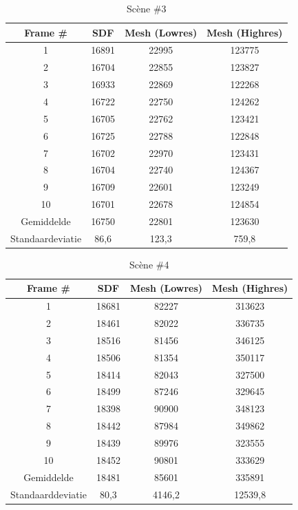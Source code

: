 \documentclass[12pt, a4paper]{article}
\begin{document}
\begin{table}[H]
	\centering
	\begin{tabular}{| c | c c c |}
		\hline
		Frame \# & SDF & Mesh (Lowres) & Mesh (Highres) \\
		\hline
		1 &16891 &22995 &123775 \\
		2 &16704 &22855 &123827 \\
		3 &16933 &22869 &122268 \\
		4 &16722 &22750 &124262 \\
		5 &16705 &22762 &123421 \\
		6 &16725 &22788 &122848 \\
		7 &16702 &22970 &123431 \\
		8 &16704 &22740 &124367 \\
		9 &16709 &22601 &123249 \\
		10 &16701 &22678 &124854 \\
		\hline
		Gemiddelde &16750 &22801 &123630 \\
		Standaardeviatie &86,6 &123,3 &759,8 \\
		\hline
	\end{tabular}
	\caption{Scène \#3}
\end{table}
\begin{table}[H]
	\centering
	\begin{tabular}{| c | c c c |}
		\hline
		Frame \# & SDF & Mesh (Lowres) & Mesh (Highres) \\
		\hline
		1 &18681 &82227 &313623 \\
		2 &18461 &82022 &336735 \\
		3 &18516 &81456 &346125 \\
		4 &18506 &81354 &350117 \\
		5 &18414 &82043 &327500 \\
		6 &18499 &87246 &329645 \\
		7 &18398 &90900 &348123 \\
		8 &18442 &87984 &349862 \\
		9 &18439 &89976 &323555 \\
		10 &18452 &90801 &333629 \\
		\hline
		Gemiddelde &18481 &85601 &335891 \\
		Standaarddeviatie &80,3 &4146,2 &12539,8 \\
		\hline
	\end{tabular}
	\caption{Scène \#4}
\end{table}
\end{document}
